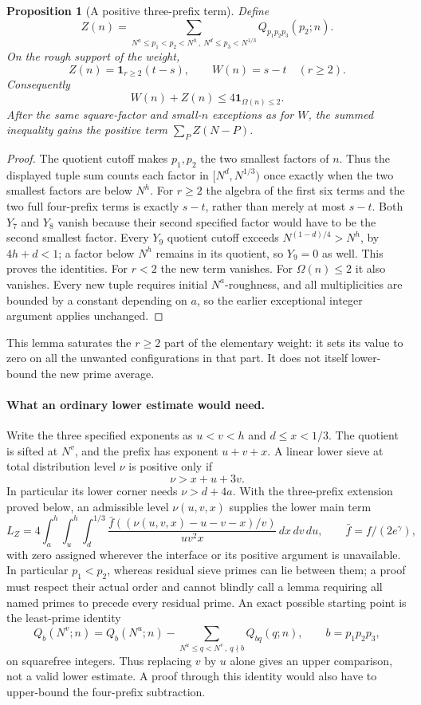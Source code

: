 \documentclass[11pt]{article}
\newtheorem{proposition}[theorem]{Proposition}
\begin{document}
\begin{proposition}[A positive three-prefix term]
Define
\[
 Z(n)=\sum_{N^a\le p_1<p_2<N^h\,,\ N^d\le p_3<N^{1/3}}
          Q_{p_1p_2p_3}(p_2;n).
\]
On the rough support of the weight,
\[
 Z(n)=\mathbf1_{r\ge2}(t-s),\qquad
 W(n)=s-t\quad(r\ge2).
\]
Consequently
\[
 W(n)+Z(n)\le4\mathbf1_{\Omega(n)\le2}.
\]
After the same square-factor and small-$n$ exceptions as for $W$,
the summed inequality gains the positive term $\sum_P Z(N-P)$.
\end{proposition}

\begin{proof}
The quotient cutoff makes $p_1,p_2$ the two smallest factors of $n$.
Thus the displayed tuple sum counts each factor in $[N^d,N^{1/3})$
once exactly when the two smallest factors are below $N^h$.
For $r\ge2$ the algebra of the first six terms and the two full
four-prefix terms is exactly $s-t$, rather than merely at most $s-t$.
Both $Y_7$ and $Y_8$ vanish because their second specified factor would
have to be the second smallest factor.  Every $Y_9$ quotient cutoff
exceeds $N^{(1-d)/4}>N^h$, by $4h+d<1$; a factor below $N^h$ remains
in its quotient, so $Y_9=0$ as well.  This proves the identities.
For $r<2$ the new term vanishes.  For $\Omega(n)\le2$ it also vanishes.
Every new tuple requires initial $N^a$-roughness, and all multiplicities
are bounded by a constant depending on $a$, so the earlier exceptional
integer argument applies unchanged.
\end{proof}

This lemma saturates the $r\ge2$ part of the elementary weight:
it sets its value to zero on all the unwanted configurations in that
part.  It does not itself lower-bound the new prime average.

\paragraph{What an ordinary lower estimate would need.}
Write the three specified exponents as $u<v<h$ and $d\le x<1/3$.
The quotient is sifted at $N^v$, and the prefix has exponent $u+v+x$.
A linear lower sieve at total distribution level $\nu$ is positive only if
\begin{equation}\label{eq:richer-Z-positivity}
 \nu>x+u+3v.
\end{equation}
In particular its lower corner needs $\nu>d+4a$.
With the three-prefix extension proved below, an admissible level
$\nu(u,v,x)$ supplies the lower main term
\[
 L_Z=4\int_a^h\int_u^h\int_d^{1/3}
  \frac{\bar f((\nu(u,v,x)-u-v-x)/v)}{u v^2 x}
  \,dx\,dv\,du,
 \qquad \bar f=f/(2e^\gamma),
\]
with zero assigned wherever the interface or its positive argument
is unavailable.
In particular $p_1<p_2$, whereas residual sieve primes can lie between
them; a proof must respect their actual order and cannot blindly call
a lemma requiring all named primes to precede every residual prime.
An exact possible starting point is the least-prime identity
\[
 Q_b(N^v;n)=Q_b(N^u;n)
 -\sum_{N^u\le q<N^v\,,\ q\nmid b}Q_{bq}(q;n),
 \qquad b=p_1p_2p_3,
\]
on squarefree integers.  Thus replacing $v$ by $u$ alone gives an
upper comparison, not a valid lower estimate.  A proof through this
identity would also have to upper-bound the four-prefix subtraction.
\end{document}
